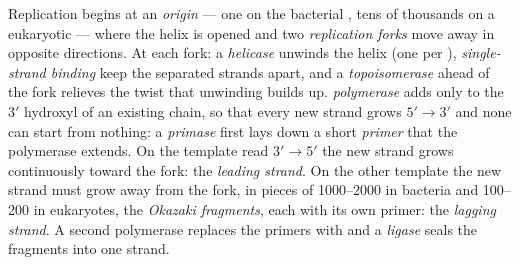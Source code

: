 \begin{definition}\label{def:b1:replication-mitosis:fork}
Replication begins at an \emph{origin} --- one on the bacterial
, tens of thousands on a eukaryotic  --- where the
helix is opened and two \emph{replication forks} move away in
opposite directions. At each fork: a \emph{helicase} unwinds the helix
(one  per ), \emph{single-strand binding } keep the
separated strands apart, and a \emph{topoisomerase} ahead of the fork
relieves the twist that unwinding builds up. \emph{ polymerase}
adds  only to the $3'$ hydroxyl of an existing chain, so
that every new strand grows $5' \to 3'$ and none can start from
nothing: a \emph{primase} first lays down a short  \emph{primer}
that the polymerase extends. On the template read $3' \to 5'$ the new
strand grows continuously toward the fork: the \emph{leading strand}.
On the other template the new strand must grow away from the fork, in
pieces of \qtyrange{1000}{2000}{}  in bacteria and
\qtyrange{100}{200}{} in eukaryotes, the \emph{Okazaki fragments},
each with its own primer: the \emph{lagging strand}. A second
polymerase replaces the primers with  and a \emph{ligase} seals the
fragments into one strand.
\end{definition}

